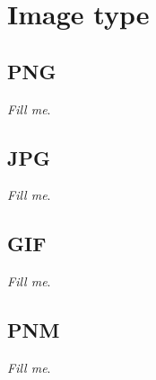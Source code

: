 \documentclass{article}
\begin{document}
		
\section{Image type}

	\subsection{PNG}

		\textit{Fill me}.

	\subsection{JPG}

		\textit{Fill me}.

	\subsection{GIF}

		\textit{Fill me}.

	\subsection{PNM}

		\textit{Fill me}.
\end{document}

